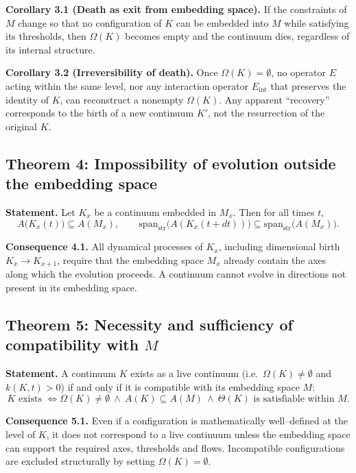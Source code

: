 \textbf{Corollary 3.1 (Death as exit from embedding space).}
If the constraints of \(M\) change so that no configuration of \(K\) can be embedded into \(M\) while satisfying its thresholds, then \(\Omega(K)\) becomes empty and the continuum dies, regardless of its internal structure.

\textbf{Corollary 3.2 (Irreversibility of death).}
Once \(\Omega(K) = \emptyset\), no operator \(E\) acting within the same level, nor any interaction operator \(E_{\mathrm{int}}\) that preserves the identity of \(K\), can reconstruct a nonempty \(\Omega(K)\).
Any apparent ``recovery'' corresponds to the birth of a new continuum \(K'\), not the resurrection of the original \(K\).

\subsection{Theorem 4: Impossibility of evolution outside the embedding space}

\textbf{Statement.}
Let \(K_x\) be a continuum embedded in \(M_x\).
Then for all times \(t\),
\[
    A\big(K_x(t)\big) \subseteq A(M_x),
    \qquad
    \mathrm{span}_{\mathrm{str}}\!\big(A(K_x(t+dt))\big) \subseteq
    \mathrm{span}_{\mathrm{str}}\!\big(A(M_x)\big).
\]

\textbf{Consequence 4.1.}
All dynamical processes of \(K_x\), including dimensional birth \(K_x \to K_{x+1}\), require that the embedding space \(M_x\) already contain the axes along which the evolution proceeds.
A continuum cannot evolve in directions not present in its embedding space.

\subsection{Theorem 5: Necessity and sufficiency of compatibility with \texorpdfstring{$M$}{M}}

\textbf{Statement.}
A continuum \(K\) exists as a live continuum (i.e.\ \(\Omega(K)\neq\emptyset\) and \(k(K,t)>0\)) if and only if it is compatible with its embedding space \(M\):
\[
    K \text{ exists }
    \Longleftrightarrow
    \Omega(K) \neq \emptyset
    \ \wedge\
    A(K) \subseteq A(M)
    \ \wedge\
    \Theta(K) \text{ is satisfiable within } M.
\]

\textbf{Consequence 5.1.}
Even if a configuration is mathematically well–defined at the level of \(K\), it does not correspond to a live continuum unless the embedding space can support the required axes, thresholds and flows.
Incompatible configurations are excluded structurally by setting \(\Omega(K) = \emptyset\).

